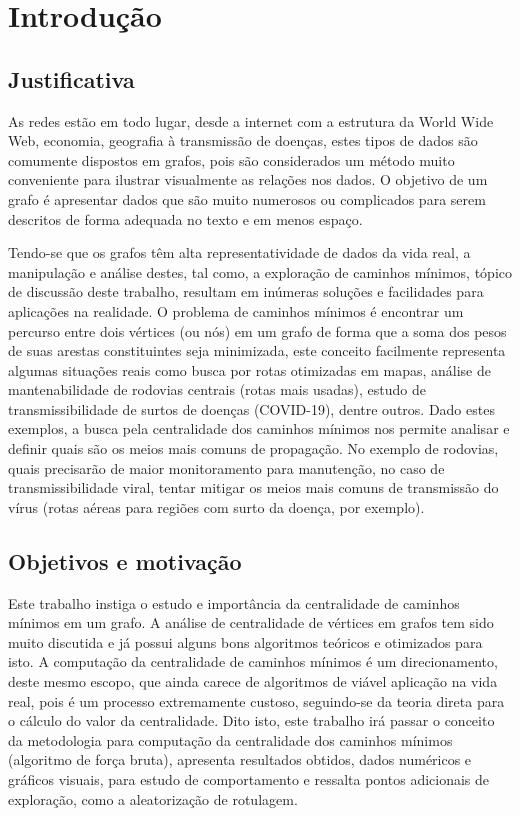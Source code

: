\chapter{Introdução}

\section{Justificativa}
As redes estão em todo lugar, desde a internet com a estrutura da World Wide Web, economia, geografia à transmissão de doenças, estes tipos de dados são comumente dispostos em grafos, pois são considerados um método muito conveniente para ilustrar visualmente as relações nos dados. O objetivo de um grafo é apresentar dados que são muito numerosos ou complicados para serem descritos de forma adequada no texto e em menos espaço.

Tendo-se que os grafos têm alta representatividade de dados da vida real, a manipulação e análise destes, tal como, a exploração de caminhos mínimos, tópico de discussão deste trabalho, resultam em inúmeras soluções e facilidades para aplicações na realidade. O problema de caminhos mínimos é encontrar um percurso entre dois vértices (ou nós) em um grafo de forma que a soma dos pesos de suas arestas constituintes seja minimizada, este conceito facilmente representa algumas situações reais como busca por rotas otimizadas em mapas, análise de mantenabilidade de rodovias centrais (rotas mais usadas), estudo de transmissibilidade de surtos de doenças (COVID-19), dentre outros. Dado estes exemplos, a busca pela centralidade dos caminhos mínimos nos permite analisar e definir quais são os meios mais comuns de propagação. No exemplo de rodovias, quais precisarão de maior monitoramento para manutenção, no caso de transmissibilidade viral, tentar mitigar os meios mais comuns de transmissão do vírus (rotas aéreas para regiões com surto da doença, por exemplo).


\section{Objetivos e motivação}
Este trabalho instiga o estudo e importância da centralidade de caminhos mínimos em um grafo. A análise de centralidade de vértices em grafos tem sido muito discutida e já possui alguns bons algoritmos teóricos e otimizados para isto. A computação da centralidade de caminhos mínimos é um direcionamento, deste mesmo escopo, que ainda carece de algoritmos de viável aplicação na vida real, pois é um processo extremamente custoso, seguindo-se da teoria direta para o cálculo do valor da centralidade. Dito isto, este trabalho irá passar o conceito da metodologia para computação da centralidade dos caminhos mínimos (algoritmo de força bruta), apresenta resultados obtidos, dados numéricos e gráficos visuais, para estudo de comportamento e ressalta pontos adicionais de exploração, como a aleatorização de rotulagem.


